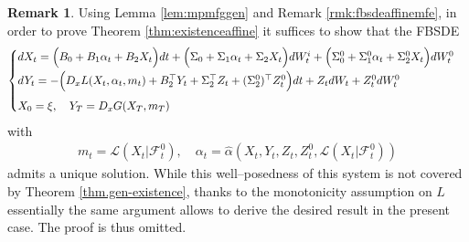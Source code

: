 \documentclass[11pt,reqno]{amsart}
\numberwithin{equation}{section}
\theoremstyle{definition}
\newtheorem{remark}[theorem]{Remark}
\newcommand{\sL}{\mathcal{L}}
\newcommand{\sF}{\mathcal{F}}
\begin{document}
\begin{remark}
\label{rem.proof.affine}
Using Lemma \ref{lem:mpmfggen} and Remark \ref{rmk:fbsdeaffinemfe}, in order to prove Theorem \ref{thm:existenceaffine} it suffices to show that the FBSDE 
\begin{align} \label{eq:nplayerfbsdeaffinemfe.appen}
 \begin{cases} \vspace{.1cm}
   dX_t = \Big(B_0 + B_1 \alpha_t + B_2 X_t \Big) dt + \Big( \Sigma_0 + \Sigma_1 \alpha_t + \Sigma_2 X_t\Big) dW_t^i + \Big(\Sigma^0_0 + \Sigma^0_1 \alpha_t + \Sigma^0_2 X_t \Big) dW_t^0   \\ \vspace{.1cm}
dY_t = - \Big( D_x L(X_t,\alpha_t, m_t) + B_2^\top Y_t + \Sigma_2^\top Z_t + (\Sigma_2^0)^\top Z_t^0 \Big) dt
+ Z_t  dW_t + Z_t^0  dW_t^0 \vspace{.1cm}  \\
X_0 = \xi, \quad Y_T = D_x G(X_T,m_T)
\end{cases} 
\end{align}
with
\begin{align*}
    m_t = \sL(X_t | \sF_t^0), \quad \alpha_t = \hat{\alpha}(X_t,Y_t,Z_t,Z_t^0, \sL(X_t | \sF_t^0))
\end{align*}
admits a unique solution.
While this well--posedness of this system is not covered by Theorem \ref{thm.gen-existence}, thanks to the monotonicity assumption on $L$ essentially the same argument allows to derive the desired result in the present case.
The proof is thus omitted.
\end{remark}





\end{document}
